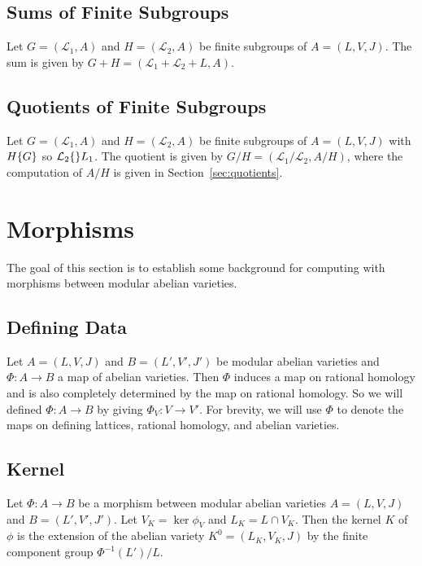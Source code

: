 \subsection{Sums of Finite Subgroups}

Let $G=(\mathcal{L}_1, A)$ and $H=(\mathcal{L}_2, A)$ be finite subgroups of
$A=(L, V, J)$. The sum is given by $G+H=(\mathcal{L}_1 + \mathcal{L}_2+L, A)$.

\subsection{Quotients of Finite Subgroups}

Let $G=(\mathcal{L}_1, A)$ and $H=(\mathcal{L}_2, A)$ be finite subgroups of
$A=(L, V, J)$ with $H\{G\}$ so $\mathcal{L}_2\{\mathcal\}{L}_1$. The quotient
is given by $G/H=(\mathcal{L}_1/\mathcal{L}_2, A/H)$, where the computation of
$A/H$ is given in Section~\ref{sec:quotients}.

\section{Morphisms}%
\label{sec:morphisms}

The goal of this section is to establish some background for computing with
morphisms between modular abelian varieties.

\subsection{Defining Data}%
\label{sub:defining_data}

Let $A=(L, V, J)$ and $B=(L', V', J')$ be modular abelian varieties and
$\Phi:A\to B$ a map of abelian varieties. Then $\Phi$ induces a map on rational
homology and is also completely determined by the map on rational homology. So
we will defined $\Phi:A\to B$ by giving $\Phi_V:V\to V'$. For brevity, we will
use $\Phi$ to denote the maps on defining lattices, rational homology, and
abelian varieties.

\subsection{Kernel}%
\label{sub:kernel}

Let $\Phi:A\to B$ be a morphism between modular abelian varieties $A=(L, V, J)$
and $B=(L', V', J')$. Let $V_K=\ker \phi_V$ and $L_K=L\cap V_K$. Then the
kernel $K$ of $\phi$ is the extension of the abelian variety $K^0 = (L_K, V_K,
J)$ by the finite component group $\Phi^{-1}(L')/L$.

